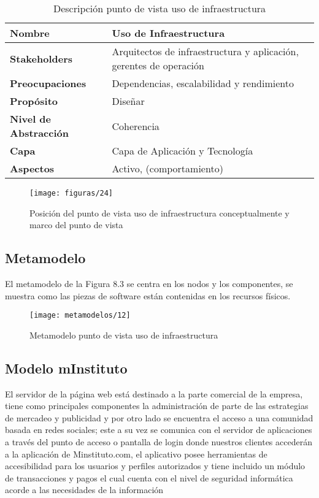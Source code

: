   \begin{table}[H]
  	\centering
  	\begin{tabular}{p{3.7cm}p{8cm}}
  		\hline
  		\rowcolor[HTML]{0073a1}
  		{\color[HTML]{FFFFFF} \textbf{Nombre}} & {\color[HTML]{FFFFFF} \textbf{Uso de Infraestructura}} \\
  		\hline
  		\textbf{Stakeholders} & Arquitectos de infraestructura y aplicación, gerentes de operación \\
  		\textbf{Preocupaciones} & Dependencias, escalabilidad y rendimiento \\
  		\textbf{Propósito} & Diseñar \\
  		\textbf{Nivel de Abstracción} & Coherencia \\
  		\textbf{Capa} & Capa de Aplicación y Tecnología \\
  		\textbf{Aspectos} & Activo, (comportamiento) \\
  		\bottomrule
  	\end{tabular}
  	\captionsetup{width=.95\textwidth}
  	\caption{Descripción punto de vista uso de infraestructura}
  	\label{tabla15}
  \end{table}
  
  \begin{figure}[H]
  	\centering
  	\texttt{[image: figuras/24]}
  	\captionsetup{width=.95\textwidth}
  	\caption{Posición del punto de vista uso de infraestructura conceptualmente y marco del punto de vista}
  	\label{figura24}
  \end{figure}
  
  \subsection{Metamodelo}
  El metamodelo de la Figura 8.3 se centra en los nodos y los componentes, se muestra como las piezas de software están contenidas en los recursos físicos.
  
  \begin{figure}[H]
  	\centering
  	\texttt{[image: metamodelos/12]}
  	\captionsetup{width=.95\textwidth}
  	\caption{Metamodelo punto de vista uso de infraestructura}
  	\label{metamodelo12}
  \end{figure}
  
  \subsection{Modelo mInstituto}
  El servidor de la página web está destinado a la parte comercial de la empresa, tiene como principales componentes la administración de parte de las estrategias de mercadeo y publicidad y por otro lado se encuentra el acceso a una comunidad basada en redes sociales; este a su vez se comunica con el servidor de aplicaciones a través del punto de acceso o pantalla de login donde nuestros clientes accederán a la aplicación de Minstituto.com, el aplicativo posee herramientas de accesibilidad para los usuarios y perfiles autorizados y tiene incluido un módulo de transacciones y pagos el cual cuenta con el nivel de seguridad informática acorde a las necesidades de la información
  
